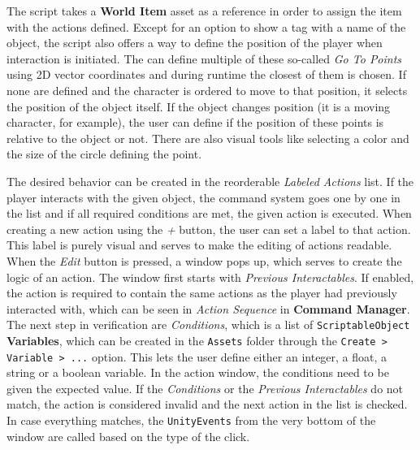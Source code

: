 The script takes a \textbf{World Item} asset as a reference in order to assign the item with the actions defined. Except for an option to show a tag with a name of the object, the script also offers a way to define the position of the player when interaction is initiated. The can define multiple of these so-called \textit{Go To Points} using 2D vector coordinates and during runtime the closest of them is chosen. If none are defined and the character is ordered to move to that position, it selects the position of the object itself. If the object changes position (it is a moving character, for example), the user can define if the position of these points is relative to the object or not. There are also visual tools like selecting a color and the size of the circle defining the point.

The desired behavior can be created in the reorderable \textit{Labeled Actions} list. If the player interacts with the given object, the command system goes one by one in the list and if all required conditions are met, the given action is executed. When creating a new action using the \textit{+} button, the user can set a label to that action. This label is purely visual and serves to make the editing of actions readable. When the \textit{Edit} button is pressed, a window pops up, which serves to create the logic of an action. The window first starts with \textit{Previous Interactables}. If enabled, the action is required to contain the same actions as the player had previously interacted with, which can be seen in \textit{Action Sequence} in \textbf{Command Manager}. The next step in verification are \textit{Conditions}, which is a list of \verb|ScriptableObject| \textbf{Variables}, which can be created in the \verb|Assets| folder through the \verb|Create > Variable > ...| option. This lets the user define either an integer, a float, a string or a boolean variable. In the action window, the conditions need to be given the expected value. If the \textit{Conditions} or the \textit{Previous Interactables} do not match, the action is considered invalid and the next action in the list is checked. In case everything matches, the \verb|UnityEvents| from the very bottom of the window are called based on the type of the click.

